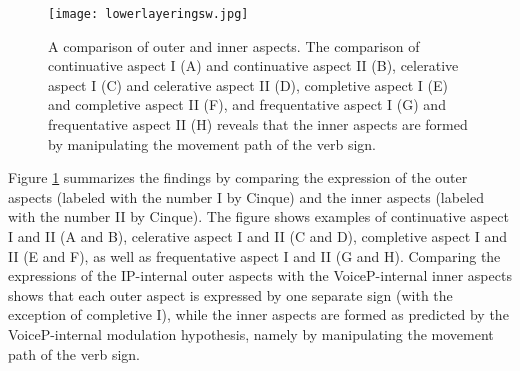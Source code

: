\begin{figure}[bt]
\centering
	\texttt{[image: lowerlayeringsw.jpg]}
	\caption{A comparison of outer and inner aspects. The comparison of continuative aspect I (A) and continuative aspect II (B), celerative aspect I (C) and celerative aspect II (D), completive aspect I (E) and completive aspect II (F), and frequentative aspect I (G) and frequentative aspect II (H) reveals that the inner aspects are formed by manipulating the movement path of the verb sign.}
	\label{fig:lowerlayering}
\end{figure}


Figure \ref{fig:lowerlayering} summarizes the findings by comparing the expression of the outer aspects (labeled with the number I by Cinque) and the inner aspects (labeled with the number II by Cinque). The figure shows examples of continuative aspect I and II (A and B), celerative aspect I and II (C and D), completive aspect I and II (E and F), as well as frequentative aspect I and II (G and H). Comparing the expressions of the IP-internal outer aspects with the VoiceP-internal inner aspects shows that each outer aspect is expressed by one separate sign (with the exception of completive I), while the inner aspects are formed as predicted by the VoiceP-internal modulation hypothesis, namely by manipulating the movement path of the verb sign.





